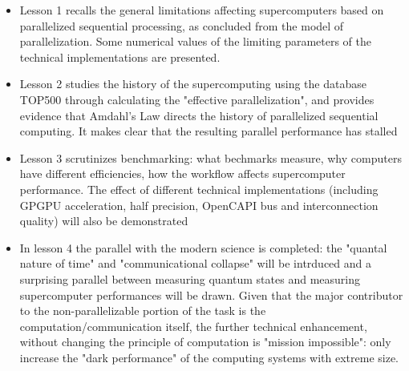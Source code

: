 {
	\begin{itemize}
		\item Lesson 1 recalls the general limitations affecting
		supercomputers based on parallelized sequential processing, 
		as concluded from the model of parallelization.
		Some numerical values of the limiting parameters of the technical implementations are presented.
		\item Lesson 2 studies the history of the supercomputing using
		the database TOP500 through calculating the "effective parallelization", and provides evidence that Amdahl's Law directs
		the history of parallelized sequential computing. It makes clear that the resulting parallel performance has stalled
		\item Lesson 3 scrutinizes benchmarking: what bechmarks measure, 
		why computers have different efficiencies, how the workflow 
		affects supercomputer performance. The effect of different technical implementations
		(including GPGPU acceleration, half precision, OpenCAPI bus and interconnection quality) will also be demonstrated
		\item In lesson 4 the parallel with the modern science is completed:
		the "quantal nature of time" and "communicational collapse" 
		will be intrduced and a surprising parallel between measuring
		quantum states and measuring supercomputer performances
		will be drawn. Given that the
		major contributor to the non-parallelizable portion of the task
		is the computation/communication itself, the further technical enhancement, without changing the principle of computation is "mission impossible": only increase the "dark performance" of the computing systems with extreme size.		
		
	\end{itemize}
}

